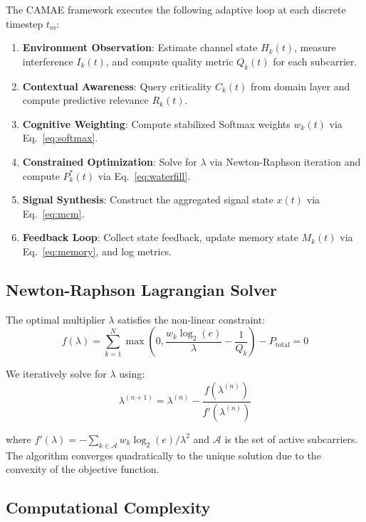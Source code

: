 \documentclass[journal,10pt,twocolumn,twoside]{IEEEtran}
\begin{document}
The CAMAE framework executes the following adaptive loop at each discrete timestep $t_m$:

\begin{enumerate}
    \item \textbf{Environment Observation}: Estimate channel state $H_k(t)$, measure interference $I_k(t)$, and compute quality metric $Q_k(t)$ for each subcarrier.
    \item \textbf{Contextual Awareness}: Query criticality $C_k(t)$ from domain layer and compute predictive relevance $R_k(t)$.
    \item \textbf{Cognitive Weighting}: Compute stabilized Softmax weights $w_k(t)$ via Eq.~\eqref{eq:softmax}.
    \item \textbf{Constrained Optimization}: Solve for $\lambda$ via Newton-Raphson iteration and compute $P_k^*(t)$ via Eq.~\eqref{eq:waterfill}.
    \item \textbf{Signal Synthesis}: Construct the aggregated signal state $x(t)$ via Eq.~\eqref{eq:mcm}.
    \item \textbf{Feedback Loop}: Collect state feedback, update memory state $M_k(t)$ via Eq.~\eqref{eq:memory}, and log metrics.
\end{enumerate}

\subsection{Newton-Raphson Lagrangian Solver}

The optimal multiplier $\lambda$ satisfies the non-linear constraint:
\begin{equation}
f(\lambda) = \sum_{k=1}^{N} \max\left(0, \frac{w_k \log_2(e)}{\lambda} - \frac{1}{Q_k}\right) - P_{\text{total}} = 0
\label{eq:lambda_constraint}
\end{equation}

We iteratively solve for $\lambda$ using:
\begin{equation}
\lambda^{(n+1)} = \lambda^{(n)} - \frac{f(\lambda^{(n)})}{f'(\lambda^{(n)})}
\label{eq:newton}
\end{equation}

where $f'(\lambda) = -\sum_{k \in \mathcal{A}} w_k \log_2(e) / \lambda^2$ and $\mathcal{A}$ is the set of active subcarriers. The algorithm converges quadratically to the unique solution due to the convexity of the objective function.

\subsection{Computational Complexity}
\end{document}
